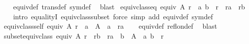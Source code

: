 \begin{isabellebody}
{}\isanewline
%
\isadelimproof
\ \ %
\endisadelimproof
%
\isatagproof
{}\isamarkupfalse%
\ equiv{\isacharunderscore}{\kern0pt}def\ trans{\isacharunderscore}{\kern0pt}def\ sym{\isacharunderscore}{\kern0pt}def\ \isamarkupfalse%
\ blast%
\endisatagproof
{\isafoldproof}%
%
\isadelimproof
\isanewline
%
\endisadelimproof
\isanewline
{}\isamarkupfalse%
\ equiv{\isacharunderscore}{\kern0pt}class{\isacharunderscore}{\kern0pt}eq{\isacharcolon}{\kern0pt}\ {\isachardoublequoteopen}equiv\ A\ r\ {\isasymLongrightarrow}\ {\isacharparenleft}{\kern0pt}a{\isacharcomma}{\kern0pt}\ b{\isacharparenright}{\kern0pt}\ {\isasymin}\ r\ {\isasymLongrightarrow}\ r{\isacharbackquote}{\kern0pt}{\isacharbackquote}{\kern0pt}{\isacharbraceleft}{\kern0pt}a{\isacharbraceright}{\kern0pt}\ {\isacharequal}{\kern0pt}\ r{\isacharbackquote}{\kern0pt}{\isacharbackquote}{\kern0pt}{\isacharbraceleft}{\kern0pt}b{\isacharbraceright}{\kern0pt}{\isachardoublequoteclose}\isanewline
%
\isadelimproof
\ \ %
\endisadelimproof
%
\isatagproof
{}\isamarkupfalse%
\ {\isacharparenleft}{\kern0pt}intro\ equalityI\ equiv{\isacharunderscore}{\kern0pt}class{\isacharunderscore}{\kern0pt}subset{\isacharsemicolon}{\kern0pt}\ force\ simp\ add{\isacharcolon}{\kern0pt}\ equiv{\isacharunderscore}{\kern0pt}def\ sym{\isacharunderscore}{\kern0pt}def{\isacharparenright}{\kern0pt}%
\endisatagproof
{\isafoldproof}%
%
\isadelimproof
\isanewline
%
\endisadelimproof
\isanewline
{}\isamarkupfalse%
\ equiv{\isacharunderscore}{\kern0pt}class{\isacharunderscore}{\kern0pt}self{\isacharcolon}{\kern0pt}\ {\isachardoublequoteopen}equiv\ A\ r\ {\isasymLongrightarrow}\ a\ {\isasymin}\ A\ {\isasymLongrightarrow}\ a\ {\isasymin}\ r{\isacharbackquote}{\kern0pt}{\isacharbackquote}{\kern0pt}{\isacharbraceleft}{\kern0pt}a{\isacharbraceright}{\kern0pt}{\isachardoublequoteclose}\isanewline
%
\isadelimproof
\ \ %
\endisadelimproof
%
\isatagproof
{}\isamarkupfalse%
\ equiv{\isacharunderscore}{\kern0pt}def\ refl{\isacharunderscore}{\kern0pt}on{\isacharunderscore}{\kern0pt}def\ \isamarkupfalse%
\ blast%
\endisatagproof
{\isafoldproof}%
%
\isadelimproof
\isanewline
%
\endisadelimproof
\isanewline
{}\isamarkupfalse%
\ subset{\isacharunderscore}{\kern0pt}equiv{\isacharunderscore}{\kern0pt}class{\isacharcolon}{\kern0pt}\ {\isachardoublequoteopen}equiv\ A\ r\ {\isasymLongrightarrow}\ r{\isacharbackquote}{\kern0pt}{\isacharbackquote}{\kern0pt}{\isacharbraceleft}{\kern0pt}b{\isacharbraceright}{\kern0pt}\ {\isasymsubseteq}\ r{\isacharbackquote}{\kern0pt}{\isacharbackquote}{\kern0pt}{\isacharbraceleft}{\kern0pt}a{\isacharbraceright}{\kern0pt}\ {\isasymLongrightarrow}\ b\ {\isasymin}\ A\ {\isasymLongrightarrow}\ {\isacharparenleft}{\kern0pt}a{\isacharcomma}{\kern0pt}\ b{\isacharparenright}{\kern0pt}\ {\isasymin}\ r{\isachardoublequoteclose}\isanewline

\end{isabellebody}
